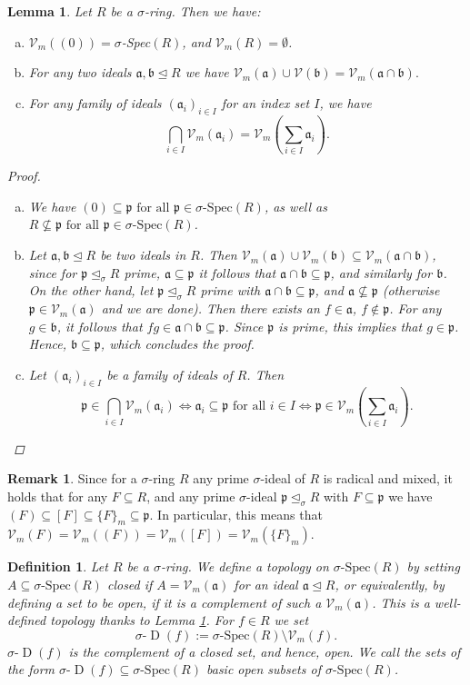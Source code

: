 \documentclass{article}
\def\Vm{\mathcal{V}_m}
\def\V{\mathcal{V}}
\def\a{\mathfrak{a}}
\def\b{\mathfrak{b}}
\def\p{\mathfrak{p}}
\def\s{\sigma}
\def\si{\unlhd_{\sigma}}
\def\sD{\s\text{-}\operatorname{D}}
\def\sSpec{\sigma\text{-Spec}}
\def\fa{\text{ for all }}
\newenvironment{bew}{\begin{proof}[Proof]}{\end{proof}}
\theoremstyle{plain}
\newtheorem{lem}[Satz]{Lemma}
\newtheorem{defn}[Satz]{Definition}
\theoremstyle{definition}
\newtheorem{rem}[Satz]{Remark}
\begin{document}
\begin{lem}\label{topologywelldef}
Let $R$ be a $\s$-ring. Then we have:
\begin{enumerate}[(a)]
\item $\Vm((0)) = \s$-Spec$(R)$, and $\Vm(R) = \emptyset$.
\item For any two ideals $\a,\b \unlhd R$ we have $\Vm(\a) \cup \V(\b) = \Vm(\a \cap \b).$
\item For any family of ideals $(\a_i)_{i \in I}$ for an index set $I$, we have $$\bigcap_{i \in I} \Vm(\a_i) = \Vm(\sum_{i \in I} \a_i).$$ \label{vmintersectionideals}
\end{enumerate}
\begin{bew} $~$
\begin{enumerate}[(a)]
\item We have $(0) \subseteq \p \fa \p \in \sSpec(R)$, as well as $R \not\subseteq \p \fa \p \in \sSpec(R)$.
\item Let $\a, \b \unlhd R$ be two ideals in $R$. Then $\Vm(\a) \cup \Vm(\b) \subseteq \Vm(\a \cap \b)$, since for $\p \si R$ prime, $\a \subseteq \p$ it follows that $\a \cap \b \subseteq \p$, and similarly for $\b$.
On the other hand, let $\p \si R$ prime with $\a \cap \b \subseteq \p$, and $\a \not\subseteq \p$ (otherwise $\p \in \Vm(\a)$ and we are done). Then there exists an $f \in \a$, $f \notin \p$. 
For any $g \in \b$, it follows that $fg \in \a \cap \b \subseteq \p$. Since $\p$ is prime, this implies that $g \in \p$. Hence, $\b \subseteq \p$, which concludes the proof.
\item Let $(\a_i)_{i \in I}$ be a family  of ideals of $R$. Then $$\p \in \bigcap_{i \in I} \Vm(\a_i) \Leftrightarrow \a_i \subseteq \p \fa i \in I \Leftrightarrow \p \in \Vm(\sum_{i \in I} \a_i).$$
\end{enumerate}
\end{bew}
\end{lem}


\begin{rem}\label{vmsequal}
Since for a $\s$-ring $R$ any prime $\s$-ideal of $R$ is radical and mixed, it holds that for any $F \subseteq R$, and any prime $\s$-ideal $\p \si R$ with $F \subseteq \p$ we have
$(F) \subseteq [F] \subseteq \{ F \}_m \subseteq \p$. In particular, this means that $\Vm(F) = \Vm((F)) = \Vm([F]) = \Vm(\{F\}_m)$. 
\end{rem}

\begin{defn}\label{deftop}
Let $R$ be a $\s$-ring. We define a topology on $\sSpec(R)$ by setting $A \subseteq \sSpec(R)$ closed if $A = \Vm(\a)$ for an ideal $\a \unlhd R$, or equivalently,
 by defining a set to be open, if it is a complement of such a $\Vm(\a)$. This is a well-defined topology thanks to Lemma \ref{topologywelldef}.
For $f \in R$ we set $$\sD(f):= \sSpec(R) \setminus \Vm(f).$$ $\sD(f)$ is the complement of a closed set, and hence, open. 
We call the sets of the form $\sD(f) \subseteq \sSpec(R)$ \emph{basic open subsets} of $\sSpec(R)$. 
\end{defn}
\end{document}
